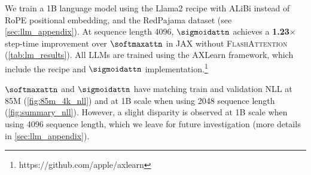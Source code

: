 We train a 1B language model using the Llama2 \citep{touvron2023llama} recipe with ALiBi instead of RoPE positional embedding, and the RedPajama \citep{together2023redpajama} dataset (see \cref{sec:llm_appendix}). At sequence length 4096, $\sigmoidattn$ achieves a \textbf{1.23}$\mathbf{\times}$ step-time improvement over $\softmaxattn$ in JAX without \textsc{FlashAttention} (\cref{tab:lm_results}). All LLMs are trained using the AXLearn framework, which include the recipe and $\sigmoidattn$ implementation.\footnote{https://github.com/apple/axlearn}

$\softmaxattn$ and $\sigmoidattn$ have matching train and validation NLL at 85M (\cref{fig:85m_4k_nll}) and at 1B scale when using 2048 sequence length (\cref{fig:summary_nll}). However, a slight disparity is observed at 1B scale when using 4096 sequence length, which we leave for future investigation (more details in \cref{sec:llm_appendix}).
